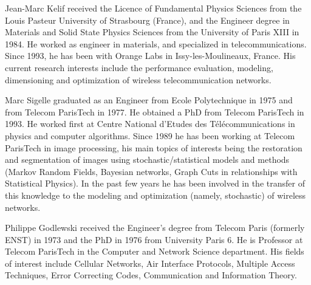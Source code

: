 \documentclass[draftcls,onecolumn]{IEEEtran}
\theoremstyle{plain}
\theoremstyle{definition}
\begin{document}
\vspace{-1.1cm}
\begin{IEEEbiography}{Jean-Marc Kelif} received the Licence of Fundamental Physics Sciences
from the Louis Pasteur University of Strasbourg (France), and
the Engineer degree in Materials and Solid State Physics Sciences from
the University of Paris XIII in 1984. He worked
as engineer in materials, and specialized in telecommunications. Since
1993, he has been with Orange Labs in Issy-les-Moulineaux, France. His current research interests include the performance evaluation, modeling, dimensioning
and optimization of wireless telecommunication networks.
\end{IEEEbiography}

\vspace{-1.1cm}
\begin{IEEEbiography}{Marc Sigelle} graduated as an Engineer from Ecole Polytechnique in 1975 and from Telecom ParisTech in 1977. He obtained a PhD from Telecom ParisTech in 1993. He worked first at Centre National d'Etudes des Télécommunications in physics and computer algorithms. Since 1989 he has been working at Telecom ParisTech in image processing, his main topics of interests being the restoration and segmentation of images using stochastic/statistical models and methods (Markov Random Fields, Bayesian networks, Graph Cuts in relationships with Statistical Physics). In the past few years he has been involved in the transfer of this knowledge to the modeling and optimization (namely, stochastic) of wireless networks. 
\end{IEEEbiography}

\vspace{-1.1cm}
\begin{IEEEbiography}{Philippe Godlewski} received the Engineer's degree from Telecom Paris (formerly ENST) in 1973 and the PhD in 1976 from University Paris 6. He is Professor at Telecom ParisTech in the Computer and Network Science department. His fields of interest include Cellular Networks, Air Interface Protocols, Multiple Access Techniques, Error Correcting Codes, Communication and Information Theory.
\end{IEEEbiography}
\end{document}
